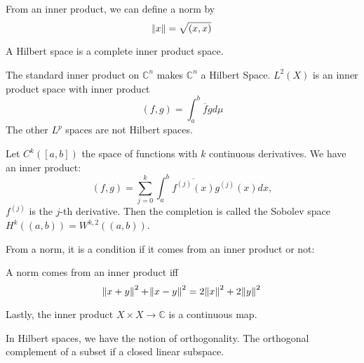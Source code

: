 \documentclass[main.tex]{subfiles}
\begin{document}
From an inner product, we can define a norm by 
$$
\norm{x} = \sqrt{(x,x)}
$$

\begin{definition}
A Hilbert space is a complete inner product space.
\end{definition}

\begin{example}
The standard inner product on $\mathbb{C}^n$ makes $\mathbb{C}^n$ a Hilbert Space. $L^2(X)$ is an inner product space with inner product
$$
(f,g) = \int_a ^b \overline{f}g d\mu
$$
The other $L^p$ spaces are not Hilbert spaces.

Let $C^k([a,b])$ the space of functions with $k$ continuous derivatives. We have an inner product:
$$
(f,g) = \sum_{j=0} ^k \int_a ^b \overline{f^{(j)}(x)} g^{(j)}(x) dx,
$$
$f^{(j)}$ is the $j$-th derivative. Then the completion is called the Sobolev space $H^k((a,b)) = W^{k,2}((a,b))$.
\end{example}

From a norm, it is a condition if it comes from an inner product or not:

\begin{theorem}
A norm comes from an inner product iff 
$$
\norm{x + y}^2 + \norm{x - y}^2 = 2\norm{x}^2 + 2\norm{y}^2
$$
\end{theorem}

Lastly, the inner product $X \times X \rightarrow \mathbb{C}$ is a continuous map.

In Hilbert spaces, we have the notion of orthogonality. The orthogonal complement of a subset if a closed linear subspace.
\end{document}
